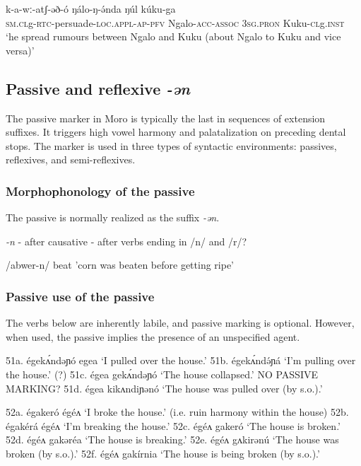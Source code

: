 \ea
\gll	k-a-wː-atʃ-əð-ó 	ŋálo-ŋ-ə́nda 	ŋúl		kúku-ga\\
	\textsc{sm.cl}g-\textsc{rtc}-persuade-\textsc{loc.appl-ap-\textsc{pfv}}	Ngalo-\textsc{acc-assoc}	\textsc{3sg.pron}	Kuku-\textsc{cl}g.\textsc{inst}\\

	‘he spread rumours between Ngalo and Kuku (about Ngalo to Kuku and vice versa)’\\
\z

\subsection{Passive and reflexive \textit{-ən}}\label{sec:ch11:antipassive}

The passive marker in Moro is typically the last in sequences of extension suffixes. It triggers high vowel harmony and palatalization on preceding dental stops. The marker is used in three types of syntactic environments: passives, reflexives, and semi-reflexives.

\subsubsection{Morphophonology of the passive}

The passive is normally realized as the suffix \textit{-ən}. 

\textit{-n} 
- after causative
- after verbs ending in /n/ and /r/?

/abwer-n/ beat 'corn was beaten before getting ripe'

\subsubsection{Passive use of the passive}


The verbs below are inherently labile, and passive marking is optional. However, when used, the passive implies the presence of an unspecified agent.

51a. égekʌ́ndəɲó egea 	‘I pulled over the house.’
51b. égekʌ́ndə́ɲá 	‘I’m pulling over the house.’ (?)
51c. égea gekʌ́ndəɲó	‘The house collapsed.’    NO PASSIVE MARKING? %
51d. égea kikʌndiɲənó	‘The house was pulled over (by  s.o.).’ 

52a. égakeró égéʌ	‘I broke the house.’ (i.e. ruin harmony within the house)
52b. égakérá égéʌ	‘I’m breaking the house.’  %
52c. égéʌ gakeró	‘The house is broken.’ 
52d. égéʌ gakəréa	‘The house is breaking.’ 
52e. égéʌ gʌkirənú	‘The house was broken (by s.o.).’ 
52f. égéʌ gakírnia	‘The house is being broken (by s.o.).’ 

